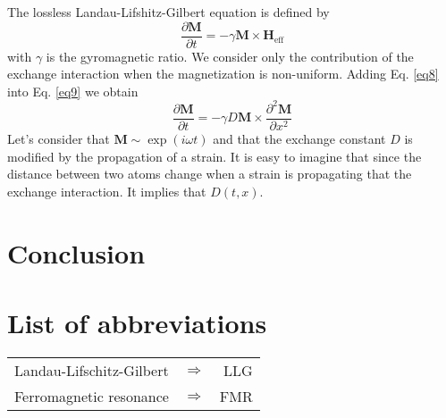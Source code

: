 \documentclass[12pt,a4paper]{article}
\begin{document}
The lossless Landau-Lifshitz-Gilbert equation is defined by
\begin{equation}
    \frac{\partial \mathbf{M}}{\partial t} = - \gamma \mathbf{M} \times \mathbf{H}_{\mathrm{eff}}
    \label{eq9}
\end{equation}
with $\gamma$ is the gyromagnetic ratio.
We consider only the contribution of the exchange interaction when the magnetization is non-uniform.
Adding Eq. \eqref{eq8} into Eq. \ref{eq9} we obtain
\begin{equation}
    \frac{\partial \mathbf{M}}{\partial t} = - \gamma D \mathbf{M} \times \frac{\partial^2 \mathbf{M}}{\partial x^2}
    \label{eq10}
\end{equation}
Let's consider that $\mathbf{M} \sim \exp \left( i \omega t \right)$ and that the exchange constant $D$ is modified by the propagation of a strain.
It is easy to imagine that since the distance between two atoms change when a strain is propagating that the exchange interaction.
It implies that $D \left(t,x\right)$.



\section{Conclusion}

\newpage

\section*{List of abbreviations}

\begin{table}[ht]
    \begin{tabular}{ l c r }
        Landau-Lifschitz-Gilbert & $\Longrightarrow$ & LLG \\
        Ferromagnetic resonance & $\Longrightarrow$ & FMR \\
    \end{tabular}
\end{table}



\end{document}
